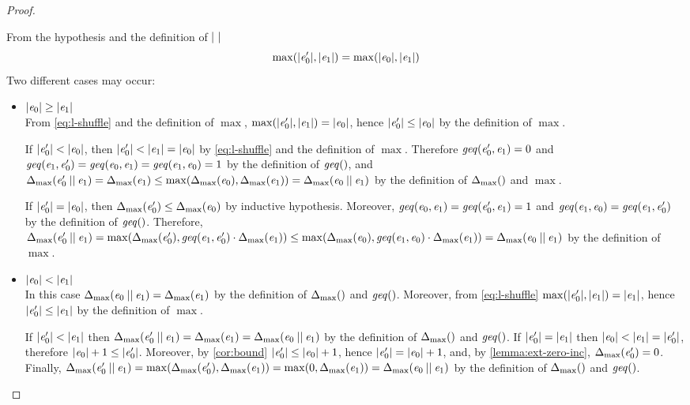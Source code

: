 \begin{proof}
\begin{description}
\begin{itemize}
          From the hypothesis and the definition of ${\mid}{\ }{\mid}$
          \begin{equation}
           \label{eq:l-shuffle}
           \max({\mid}{\mathit {e}_0'}{\mid},{\mid}{\mathit {e}_1}{\mid})=\max({\mid}{\mathit {e}_0}{\mid},{\mid}{\mathit {e}_1}{\mid})
          \end{equation}
          Two different cases may occur:
          \begin{itemize}
           \item ${\mid}{\mathit {e}_0}{\mid}\geq{\mid}{\ensuremath{\mathit {e}}_1}{\mid}$\\
                 From \cref{eq:l-shuffle} and the definition of $\max$, $\max({\mid}{\mathit {e}_0'}{\mid},{\mid}{\mathit {e}_1}{\mid})={\mid}{\mathit {e}_0}{\mid}$, hence ${\mid}{\mathit {e}_0'}{\mid}\leq{\mid}{\ensuremath{\mathit {e}}_0}{\mid}$ by the definition of $\max$.

                 If ${\mid}{\mathit {e}_0'}{\mid}<{\mid}{\mathit {e}_0}{\mid}$, then ${\mid}{\mathit {e}_0'}{\mid}<{\mid}{\mathit {e}_1}{\mid}={\mid}{\mathit {e}_0}{\mid}$ by \cref{eq:l-shuffle} and the definition of $\max$. Therefore $\mathit{geq}({\mathit {e}_0'},{\mathit {e}_1})= 0$ and $\mathit{geq}({\mathit {e}_1},{\mathit {e}_0'})=\mathit{geq}({\mathit {e}_0},{\mathit {e}_1})=\mathit{geq}({\mathit {e}_1},{\mathit {e}_0})=1$ by the definition of $\mathit{geq}()$, and
                 ${\Delta_{\max}}({\mathit {e}_0'\mathbin{||}\mathit {e}_1})={\Delta_{\max}}({\mathit {e}_1})\leq\max({\Delta_{\max}}({\mathit {e}_0}),{\Delta_{\max}}({\mathit {e}_1}))={\Delta_{\max}}({\mathit {e}_0\mathbin{||}\mathit {e}_1})$ by the definition of ${\Delta_{\max}}({})$ and $\max$.


                 If ${\mid}{\mathit {e}_0'}{\mid}={\mid}{\mathit {e}_0}{\mid}$, then ${\Delta_{\max}}({\mathit {e}_0'})\leq{\Delta_{\max}}({\mathit {e}_0})$ by inductive hypothesis. Moreover,
                 $\mathit{geq}({\mathit {e}_0},{\mathit {e}_1})=\mathit{geq}({\mathit {e}'_0},{\mathit {e}_1})=1$ and $\mathit{geq}({\mathit {e}_1},{\mathit {e}_0})=\mathit{geq}({\mathit {e}_1},{\mathit {e}'_0})$ by the definition of $\mathit{geq}()$.
                 Therefore, ${\Delta_{\max}}({\mathit {e}_0'\mathbin{||}\mathit {e}_1})=\max({\Delta_{\max}}({\mathit {e}'_0}),\mathit{geq}({\mathit {e}_1},{\mathit {e}_0'})\cdot{\Delta_{\max}}({\mathit {e}_1}))\leq\max({\Delta_{\max}}({\mathit {e}_0}),\mathit{geq}({\mathit {e}_1},{\mathit {e}_0})\cdot{\Delta_{\max}}({\mathit {e}_1}))={\Delta_{\max}}({\mathit {e}_0\mathbin{||}\mathit {e}_1})$ by the definition of $\max$.
           \item ${\mid}{\mathit {e}_0}{\mid}<{\mid}{\mathit {e}_1}{\mid}$\\
                 In this case ${\Delta_{\max}}({\mathit {e}_0\mathbin{||}\mathit {e}_1})={\Delta_{\max}}({\mathit {e}_1})$ by the definition of ${\Delta_{\max}}({})$ and $\mathit{geq}()$. Moreover, from \cref{eq:l-shuffle} $\max({\mid}{\mathit {e}_0'}{\mid},{\mid}{\mathit {e}_1}{\mid})={\mid}{\mathit {e}_1}{\mid}$, hence ${\mid}{\mathit {e}_0'}{\mid}\leq{\mid}{\ensuremath{\mathit {e}}_1}{\mid}$ by the definition of $\max$.

                 If ${\mid}{\mathit {e}_0'}{\mid}<{\mid}{\mathit {e}_1}{\mid}$ then ${\Delta_{\max}}({\mathit {e}_0'\mathbin{||}\mathit {e}_1})={\Delta_{\max}}({\mathit {e}_1})={\Delta_{\max}}({\mathit {e}_0\mathbin{||}\mathit {e}_1})$ by the definition of ${\Delta_{\max}}({})$ and $\mathit{geq}()$. If ${\mid}{\mathit {e}_0'}{\mid}={\mid}{\mathit {e}_1}{\mid}$ then ${\mid}{\mathit {e}_0}{\mid}<{\mid}{\mathit {e}_1}{\mid}={\mid}{\mathit {e}_0'}{\mid}$, therefore ${\mid}{\mathit {e}_0}{\mid}+1\leq{\mid}{\ensuremath{\mathit {e}}_0'}{\mid}$. Moreover, by \cref{cor:bound} ${\mid}{\mathit {e}'_0}{\mid}\leq{\mid}{\ensuremath{\mathit {e}}_0}{\mid}+1$, hence ${\mid}{\mathit {e}_0'}{\mid}={\mid}{\mathit {e}_0}{\mid}+1$, and, by \cref{lemma:ext-zero-inc}, ${\Delta_{\max}}({\mathit {e}_0'})=0$. Finally,
                 ${\Delta_{\max}}({\mathit {e}_0'\mathbin{||}\mathit {e}_1})=\max({\Delta_{\max}}({\mathit {e}_0'}),{\Delta_{\max}}({\mathit {e}_1}))=\max(0,{\Delta_{\max}}({\mathit {e}_1}))={\Delta_{\max}}({\mathit {e}_0\mathbin{||}\mathit {e}_1})$ by the definition of ${\Delta_{\max}}({})$ and $\mathit{geq}()$.
          \end{itemize}



\end{itemize}
\end{description}
\end{proof}
